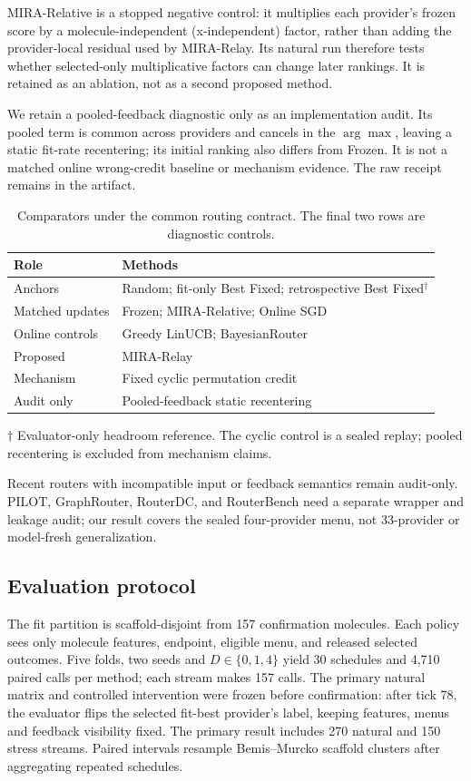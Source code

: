 \documentclass[sigconf,anonymous]{aamas}
\newcommand{\MiraTableFont}{\fontsize{9}{11}\selectfont}
\newcommand{\tnote}[1]{{\fontsize{8.5}{10}\selectfont\raggedright\par\vspace{3pt}#1\par}}
\begin{document}
MIRA-Relative is a stopped negative control: it multiplies each provider's frozen score by a molecule-independent (x-independent) factor, rather than adding the provider-local residual used by MIRA-Relay. Its natural run therefore tests whether selected-only multiplicative factors can change later rankings. It is retained as an ablation, not as a second proposed method.

We retain a pooled-feedback diagnostic only as an implementation audit. Its
pooled term is common across providers and cancels in the $\arg\max$, leaving
a static fit-rate recentering; its initial ranking also differs from Frozen. It
is not a matched online wrong-credit baseline or mechanism evidence. The raw
receipt remains in the artifact.

\begin{table}[t]
\caption{Comparators under the common routing contract. The final two rows are diagnostic controls.}
\label{tab:baselines}
\MiraTableFont
\setlength{\tabcolsep}{4pt}
\begin{tabular}{@{}lp{}@{}}
\toprule
Role & Methods \\
\midrule
Anchors & Random; fit-only Best Fixed; retrospective Best Fixed$^{\dagger}$ \\
Matched updates & Frozen; MIRA-Relative; Online SGD \\
Online controls & Greedy LinUCB; BayesianRouter \\
Proposed & MIRA-Relay \\
\midrule
Mechanism & Fixed cyclic permutation credit \\
Audit only & Pooled-feedback static recentering \\
\bottomrule
\end{tabular}
\tnote{$\dagger$ Evaluator-only headroom reference. The cyclic control is a sealed replay; pooled recentering is excluded from mechanism claims.}
\end{table}

Recent routers with incompatible input or feedback semantics remain audit-only. PILOT, GraphRouter, RouterDC, and RouterBench need a separate wrapper and leakage audit; our result covers the sealed four-provider menu, not 33-provider or model-fresh generalization.

\subsection{Evaluation protocol}
The fit partition is scaffold-disjoint from 157 confirmation molecules. Each policy sees only molecule features, endpoint, eligible menu, and released selected outcomes. Five folds, two seeds and $D\in\{0,1,4\}$ yield 30 schedules and 4,710 paired calls per method; each stream makes 157 calls. The primary natural matrix and controlled intervention were frozen before confirmation: after tick 78, the evaluator flips the selected fit-best provider's label, keeping features, menus and feedback visibility fixed. The primary result includes 270 natural and 150 stress streams. Paired intervals resample Bemis--Murcko scaffold clusters after aggregating repeated schedules.
\end{document}

